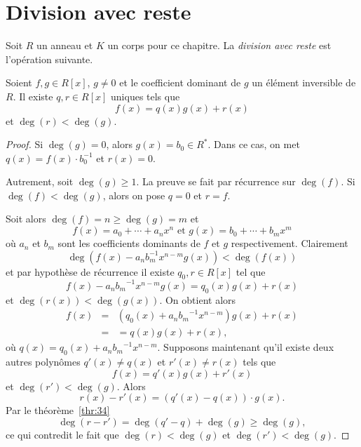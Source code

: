 \section{Division avec reste} 
\label{sec:divisibilite}

Soit $R$ un anneau et $K$ un corps pour ce chapitre. La \emph{division avec reste} est l'opération suivante. 

\begin{theorem}
  \label{thr:33}
  Soient $f,g \in R[x]$, $g ≠ 0$ et le coefficient dominant de $g$ un élément  inversible de $R$.   Il existe $q,r \in R[x]$ uniques tels que 
  \begin{displaymath}
    f(x) = q(x) g(x) + r(x) 
  \end{displaymath}
  et $\deg(r) < \deg(g)$. 
\end{theorem}


\begin{proof}
  Si $\deg(g) = 0$, alors $g(x) = b_0 ∈ R^*$. Dans ce cas, on met $q(x) = f(x) ⋅ b_0^{-1}$ et $r(x) = 0$.
  
  Autrement, soit $\deg(g) ≥  1$.  La preuve se fait par récurrence sur $\deg(f)$. Si  $\deg(f) < \deg(g)$, alors on pose $q = 0$ et $r = f$.

Soit alors $\deg(f) = n \geq \deg(g)=m$ et 
\begin{displaymath}
  f(x) = a_0+ \cdots +a_n x^n \text{ et } g(x) = b_0 + \cdots + b_m x^m 
\end{displaymath}
où $a_n$ et $b_m$ sont les coefficients dominants de $f$ et $g$ respectivement. 
Clairement 
\begin{displaymath}
  \deg\left( f(x) - a_n b^{-1}_m  x^{n-m} g(x) \right) < \deg(f(x))
\end{displaymath}
et par hypothèse de récurrence il existe $q_0,r ∈R[x]$ tel que 
\begin{displaymath}
  f(x) - {a_n}{ b_m }^{-1} x^{n-m} g(x)  = q_0(x) g(x) + r(x) 
\end{displaymath}
et $\deg(r(x)) < \deg(g(x))$. On  obtient alors
\begin{eqnarray*}
  f(x) & = &  \left(q_0(x) + {a_n}{ b_m }^{-1} x^{n-m} \right) g(x) + r(x) \\
       & = & = q(x)g(x) + r(x),
\end{eqnarray*}
 où $q(x) = q_0(x) + {a_n}{ b_m }^{-1} x^{n-m}$. 
%
Supposons maintenant qu'il existe deux autres polynômes $q'(x) \neq q(x)$ et $r'(x) \neq r(x)$ tels que 
\begin{displaymath}
    f(x) = q'(x) g(x) + r'(x) 
  \end{displaymath}
  et $\deg(r') < \deg(g)$. 
Alors 
\begin{displaymath}
   r(x) - r'(x) = (q'(x) - q(x)) ⋅ g(x). 
\end{displaymath}
Par le théorème~\ref{thr:34}
\begin{displaymath}
 \deg( r - r')  = \deg(q' - q) + \deg(g) \geq \deg(g), 
\end{displaymath}
ce qui contredit le fait que $\deg(r) < \deg(g)$ et $\deg(r') < \deg(g)$. 
\end{proof}


